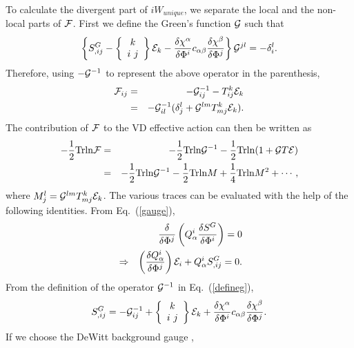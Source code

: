 \documentclass[a4paper,aps,preprint,groupedaddress,showpacs]{revtex4}
\begin{document}
To calculate the divergent part of $iW_{unique}$, we separate
the local and the non-local parts of ${\cal F}$. First we 
define the Green's function ${\cal G}$ such that
\begin{equation}
\left\{S^{G}_{,ij}-
\left\{\begin{array}{c}k \\ i\ j\end{array}\right\}
{\cal E}_{k}-
\frac{\delta\chi^{\alpha}}{\delta\Phi^{i}}c_{\alpha\beta}
\frac{\delta\chi^{\beta}}{\delta\Phi^{j}}\right\}
{\cal G}^{jl}=-\delta^{l}_{i}.
\label{defineg}
\end{equation}
Therefore, using $-{\cal G}^{-1}$ to represent the above
operator in the parenthesis,
\begin{eqnarray}
{\cal F}_{ij}&=&-{\cal G}^{-1}_{ij}-T^{k}_{ij}{\cal E}_{k}
\nonumber\\
&=&-{\cal G}^{-1}_{il}(\delta^{l}_{j}+
{\cal G}^{lm}T^{k}_{mj}{\cal E}_{k}).
\end{eqnarray}
The contribution of ${\cal F}$ to the VD effective action
can then be written as
\begin{eqnarray}
-\frac{1}{2}{\rm Trln}{\cal F}&=&
-\frac{1}{2}{\rm Trln}{\cal G}^{-1}-
\frac{1}{2}{\rm Trln}(1+{\cal G}T{\cal E})\nonumber\\
&=&-\frac{1}{2}{\rm Trln}{\cal G}^{-1}-
\frac{1}{2}{\rm Trln}M+\frac{1}{4}{\rm Trln}M^{2}+\cdots,
\label{fexpand}
\end{eqnarray}
where $M^{l}_{j}={\cal G}^{lm}T^{k}_{mj}{\cal E}_{k}$.
The various traces can be evaluated with the help of the 
following identities. From Eq.~(\ref{gauge}),
\begin{eqnarray}
&&\frac{\delta}{\delta\Phi^{j}}
\left(Q^{i}_{\alpha}\frac{\delta S^{G}}{\delta\Phi^{i}}
\right)=0 
\nonumber\\
&\Rightarrow&\left(\frac{\delta Q^{i}_{\alpha}}
{\delta\Phi^{j}}\right){\cal E}_{i}+
Q^{i}_{\alpha}S^{G}_{,ij}=0.
\label{ident}
\end{eqnarray}
From the definition of the operator ${\cal G}^{-1}$ in 
Eq.~(\ref{defineg}),
\begin{equation}
S^{G}_{,ij}=-{\cal G}^{-1}_{ij}+
\left\{ \begin{array}{c} k \\ i\ j \end{array}\right\}
{\cal E}_{k}+
\frac{\delta\chi^{\alpha}}{\delta\Phi^{i}}c_{\alpha\beta}
\frac{\delta\chi^{\beta}}{\delta\Phi^{j}}.
\end{equation}
If we choose the DeWitt background gauge \cite{BD2},
\end{document}
